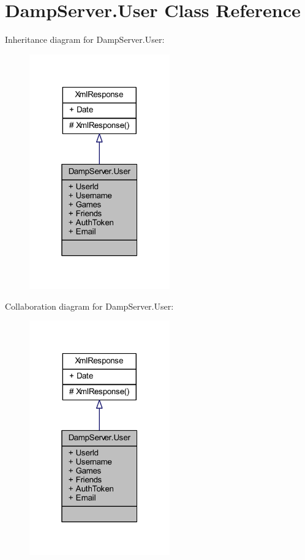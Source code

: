 \hypertarget{class_damp_server_1_1_user}{\section{Damp\-Server.\-User Class Reference}
\label{class_damp_server_1_1_user}
}


Inheritance diagram for Damp\-Server.\-User\-:\nopagebreak
\begin{figure}[H]
\begin{center}
\leavevmode
\includegraphics[width=172pt]{class_damp_server_1_1_user__inherit__graph}
\end{center}
\end{figure}


Collaboration diagram for Damp\-Server.\-User\-:\nopagebreak
\begin{figure}[H]
\begin{center}
\leavevmode
\includegraphics[width=172pt]{class_damp_server_1_1_user__coll__graph}
\end{center}
\end{figure}
